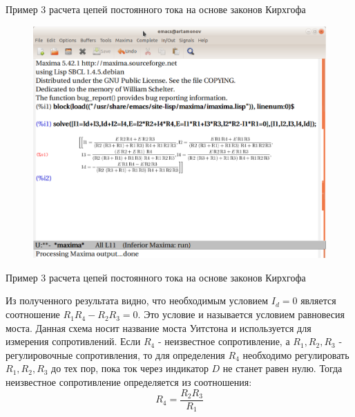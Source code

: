 \documentclass[10pt, pdf, hyperref={unicode},handout]{beamer}
\begin{document}
\begin{frame}{Пример 3 расчета цепей постоянного тока на основе законов Кирхгофа}
  \begin{block}

    \small{
\begin{figure}[htb] 
    \centering
    \includegraphics [scale=0.8]{ris17.eps}
  \end{figure}
}
  \end{block}
  
\end{frame}

\begin{frame}{Пример 3 расчета цепей постоянного тока на основе законов Кирхгофа}
  \begin{block}

    \small{
Из полученного результата видно, что необходимым условием $I_d=0$ является соотношение $R_1R_4-R_2R_3=0$. Это условие и называется условием равновесия моста. Данная схема носит название моста Уитстона и используется для измерения сопротивлений. Если $R_4$ - неизвестное сопротивление, а $R_1,R_2,R_3$ - регулировочные сопротивления, то для определения $R_4$ необходимо регулировать $R_1,R_2,R_3$ до тех пор, пока ток через индикатор $D$ не станет равен нулю. Тогда неизвестное сопротивление определяется из соотношения: $$R_4=\frac{R_2R_3}{R_1}$$
}
  \end{block}
  
\end{frame}
\end{document}
